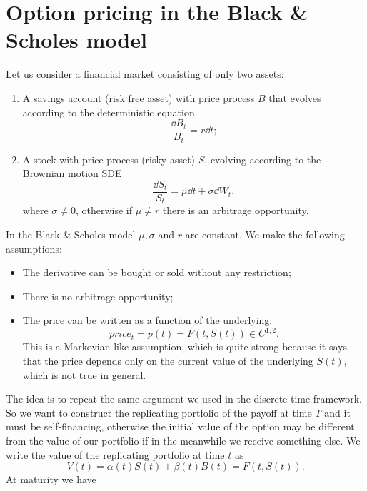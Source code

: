\section{Option pricing in the Black \& Scholes model} %
Let us consider a financial market consisting of only two assets:
\begin{enumerate}
    \item A savings account (risk free asset) with price process $B$
    that evolves according to the deterministic equation
    \begin{equation}
        \dfrac{\dd B_t}{B_t} = r \dd t;
    \end{equation}
    \item A stock with price process (risky asset) $S$, evolving according to the Brownian motion SDE
    \begin{equation}\label{bmsde}
        \dfrac{\dd S_t}{S_t} = \mu \dd t + \sigma \dd W_t,
    \end{equation}
    where $\sigma\ne0$, otherwise if $\mu\ne r$ there is an arbitrage opportunity.
\end{enumerate}
In the Black \& Scholes model $\mu,\sigma$ and $r$ are constant. We make the following assumptions:
\begin{itemize}
    \item The derivative can be bought or sold without any restriction;
    \item There is no arbitrage opportunity;
    \item The price can be written as a function of the underlying:
    \begin{equation}
        price_t = p(t) = F(t,S(t))\in C^{1,2}.
    \end{equation}
    This is a Markovian-like assumption, which is quite strong because it says that the price depends only on the current value of the underlying $S(t)$, which is not true in general.
\end{itemize}
The idea is to repeat the same argument we used in the discrete time framework. So we want to construct the replicating portfolio of the payoff at time $T$ and it must be self-financing, otherwise the initial value of the option may be different from the value of our portfolio if in the meanwhile we receive something else. We write the value of the replicating portfolio at time $t$ as
\begin{equation}\label{v}
    V(t) = \alpha(t)S(t) + \beta(t)B(t) = F(t,S(t)).
\end{equation}
At maturity we have

